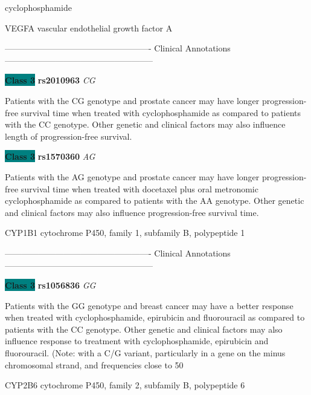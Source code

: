 \documentclass{resume} %
\begin{document}
\begin{rSection}{ cyclophosphamide }
\begin{rSubsection}{ VEGFA }{ vascular endothelial growth factor A }{}{}
\item[] ---------------------------------------------------- Clinical Annotations -----------------------------------------------------\newline
\item \textbf{\colorbox{teal} {Class 3}} \textbf{ rs2010963 } \textit{ CG }
\item[] Patients with the CG genotype and prostate cancer may have longer progression-free survival time when treated with cyclophosphamide as compared to patients with the CC genotype. Other genetic and clinical factors may also influence length of progression-free survival.\item \textbf{\colorbox{teal} {Class 3}} \textbf{ rs1570360 } \textit{ AG }
\item[] Patients with the AG genotype and prostate cancer may have longer progression-free survival time when treated with docetaxel plus oral metronomic cyclophosphamide as compared to patients with the AA genotype. Other genetic and clinical factors may also influence progression-free survival time.
\end{rSubsection}\begin{rSubsection}{ CYP1B1 }{ cytochrome P450, family 1, subfamily B, polypeptide 1 }{}{}
\item[]

\item[] ---------------------------------------------------- Clinical Annotations -----------------------------------------------------\newline
\item \textbf{\colorbox{teal} {Class 3}} \textbf{ rs1056836 } \textit{ GG }
\item[] Patients with the GG genotype and breast cancer may have a better response when treated with cyclophosphamide, epirubicin and fluorouracil as compared to patients with the CC genotype. Other genetic and clinical factors may also influence response to treatment with cyclophosphamide, epirubicin and fluorouracil.  (Note: with a C/G variant, particularly in a gene on the minus chromosomal strand, and frequencies close to 50%
\end{rSubsection}\begin{rSubsection}{ CYP2B6 }{ cytochrome P450, family 2, subfamily B, polypeptide 6 }{}{}
\item[]


\end{rSubsection}
\end{rSection}
\end{document}
